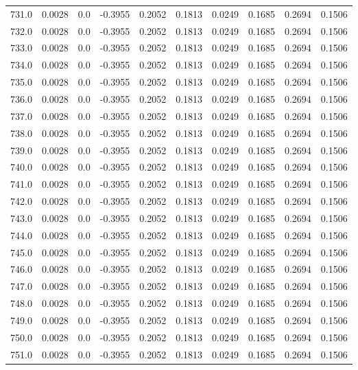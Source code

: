 \begin{longtable}{lrrrrrrrrr}
731.0 & 0.0028 & 0.0 & -0.3955 & 0.2052 & 0.1813 & 0.0249 & 0.1685 & 0.2694 & 0.1506 \\
732.0 & 0.0028 & 0.0 & -0.3955 & 0.2052 & 0.1813 & 0.0249 & 0.1685 & 0.2694 & 0.1506 \\
733.0 & 0.0028 & 0.0 & -0.3955 & 0.2052 & 0.1813 & 0.0249 & 0.1685 & 0.2694 & 0.1506 \\
734.0 & 0.0028 & 0.0 & -0.3955 & 0.2052 & 0.1813 & 0.0249 & 0.1685 & 0.2694 & 0.1506 \\
735.0 & 0.0028 & 0.0 & -0.3955 & 0.2052 & 0.1813 & 0.0249 & 0.1685 & 0.2694 & 0.1506 \\
736.0 & 0.0028 & 0.0 & -0.3955 & 0.2052 & 0.1813 & 0.0249 & 0.1685 & 0.2694 & 0.1506 \\
737.0 & 0.0028 & 0.0 & -0.3955 & 0.2052 & 0.1813 & 0.0249 & 0.1685 & 0.2694 & 0.1506 \\
738.0 & 0.0028 & 0.0 & -0.3955 & 0.2052 & 0.1813 & 0.0249 & 0.1685 & 0.2694 & 0.1506 \\
739.0 & 0.0028 & 0.0 & -0.3955 & 0.2052 & 0.1813 & 0.0249 & 0.1685 & 0.2694 & 0.1506 \\
740.0 & 0.0028 & 0.0 & -0.3955 & 0.2052 & 0.1813 & 0.0249 & 0.1685 & 0.2694 & 0.1506 \\
741.0 & 0.0028 & 0.0 & -0.3955 & 0.2052 & 0.1813 & 0.0249 & 0.1685 & 0.2694 & 0.1506 \\
742.0 & 0.0028 & 0.0 & -0.3955 & 0.2052 & 0.1813 & 0.0249 & 0.1685 & 0.2694 & 0.1506 \\
743.0 & 0.0028 & 0.0 & -0.3955 & 0.2052 & 0.1813 & 0.0249 & 0.1685 & 0.2694 & 0.1506 \\
744.0 & 0.0028 & 0.0 & -0.3955 & 0.2052 & 0.1813 & 0.0249 & 0.1685 & 0.2694 & 0.1506 \\
745.0 & 0.0028 & 0.0 & -0.3955 & 0.2052 & 0.1813 & 0.0249 & 0.1685 & 0.2694 & 0.1506 \\
746.0 & 0.0028 & 0.0 & -0.3955 & 0.2052 & 0.1813 & 0.0249 & 0.1685 & 0.2694 & 0.1506 \\
747.0 & 0.0028 & 0.0 & -0.3955 & 0.2052 & 0.1813 & 0.0249 & 0.1685 & 0.2694 & 0.1506 \\
748.0 & 0.0028 & 0.0 & -0.3955 & 0.2052 & 0.1813 & 0.0249 & 0.1685 & 0.2694 & 0.1506 \\
749.0 & 0.0028 & 0.0 & -0.3955 & 0.2052 & 0.1813 & 0.0249 & 0.1685 & 0.2694 & 0.1506 \\
750.0 & 0.0028 & 0.0 & -0.3955 & 0.2052 & 0.1813 & 0.0249 & 0.1685 & 0.2694 & 0.1506 \\
751.0 & 0.0028 & 0.0 & -0.3955 & 0.2052 & 0.1813 & 0.0249 & 0.1685 & 0.2694 & 0.1506 \\

\end{longtable}
